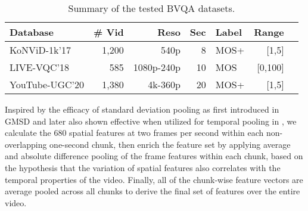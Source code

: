 \documentclass[transmag]{IEEEtran}
\begin{document}
\begin{table}[!t]
\footnotesize
\setlength{\tabcolsep}{4pt}
\caption{Summary of the tested BVQA datasets.}
\label{table:dataset}
\centering
\begin{tabular}{ lrrrlrr }
\toprule
Database & \# Vid  & Reso & Sec &  Label & Range   \\ \midrule
KoNViD-1k'17 \cite{hosu2017konstanz}  & 1,200 & 540p & 8  & MOS+ & [1,5]  \\
 LIVE-VQC'18 \cite{sinno2018large}  & 585   & 1080p-240p & 10  & MOS & [0,100]  \\
  YouTube-UGC'20 \cite{wang2019youtube}  & 1,380  & 4k-360p & 20 & MOS+ & [1,5] \\
 \bottomrule
\end{tabular}
\end{table}

Inspired by the efficacy of standard deviation pooling as first introduced in GMSD \cite{xue2013gradient} and later also shown effective when utilized for temporal pooling in \cite{korhonen2019two, tu2020ugc}, we calculate the 680 spatial features at two frames per second within each non-overlapping one-second chunk, then enrich the feature set by applying average and absolute difference pooling \cite{tu2020comparative} of the frame features within each chunk, based on the hypothesis that the variation of spatial features also correlates with the temporal properties of the video. Finally, all of the chunk-wise feature vectors are average pooled across all chunks to derive the final set of features over the entire video.
\end{document}
